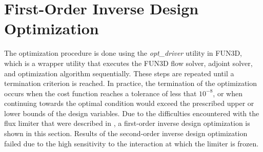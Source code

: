 \section{First-Order Inverse Design Optimization}
\label{inv-design-opt}

The optimization procedure is done using the \textit{opt\_driver} utility in
FUN3D, which is a wrapper utility that executes the FUN3D flow solver, adjoint
solver, and optimization algorithm sequentially.  These steps are repeated until
a termination criterion is reached.  In practice, the termination of the
optimization occurs when the cost function reaches a tolerance of less that
$10^{-8}$, or when continuing towards the optimal condition would exceed the
prescribed upper or lower bounds of the design variables.  Due to the
difficulties encountered with the flux limiter that were described in
, a first-order inverse design optimization is shown in
this section.  Results of the second-order inverse design optimization failed
due to the high sensitivity to the interaction at which the limiter is frozen.

